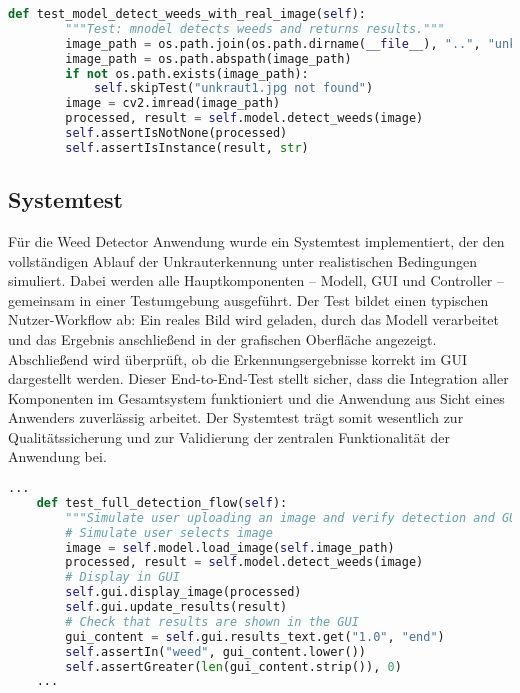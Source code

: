 \documentclass[12pt, a4paper]{scrreprt}
\begin{document}
\begin{lstlisting}[language=Python, caption= Beispiel Integrations-Test]
    def test_model_detect_weeds_with_real_image(self):
        """Test: mnodel detects weeds and returns results."""
        image_path = os.path.join(os.path.dirname(__file__), "..", "unkraut1.jpg")
        image_path = os.path.abspath(image_path)
        if not os.path.exists(image_path):
            self.skipTest("unkraut1.jpg not found")
        image = cv2.imread(image_path)
        processed, result = self.model.detect_weeds(image)
        self.assertIsNotNone(processed)
        self.assertIsInstance(result, str)
    \end{lstlisting}

\subsection{Systemtest}
Für die Weed Detector Anwendung wurde ein Systemtest implementiert, der den vollständigen Ablauf der Unkrauterkennung unter realistischen Bedingungen simuliert. Dabei werden alle Hauptkomponenten – Modell, GUI und Controller – gemeinsam in einer Testumgebung ausgeführt. Der Test bildet einen typischen Nutzer-Workflow ab: Ein reales Bild wird geladen, durch das Modell verarbeitet und das Ergebnis anschließend in der grafischen Oberfläche angezeigt. Abschließend wird überprüft, ob die Erkennungsergebnisse korrekt im GUI dargestellt werden. Dieser End-to-End-Test stellt sicher, dass die Integration aller Komponenten im Gesamtsystem funktioniert und die Anwendung aus Sicht eines Anwenders zuverlässig arbeitet. Der Systemtest trägt somit wesentlich zur Qualitätssicherung und zur Validierung der zentralen Funktionalität der Anwendung bei.\\

\begin{lstlisting}[language=Python, caption=Code-Snippet Systemtest]
    ...
    def test_full_detection_flow(self):
        """Simulate user uploading an image and verify detection and GUI update."""
        # Simulate user selects image
        image = self.model.load_image(self.image_path)
        processed, result = self.model.detect_weeds(image)
        # Display in GUI
        self.gui.display_image(processed)
        self.gui.update_results(result)
        # Check that results are shown in the GUI
        gui_content = self.gui.results_text.get("1.0", "end")
        self.assertIn("weed", gui_content.lower())
        self.assertGreater(len(gui_content.strip()), 0)
    ...
    \end{lstlisting}
\end{document}
